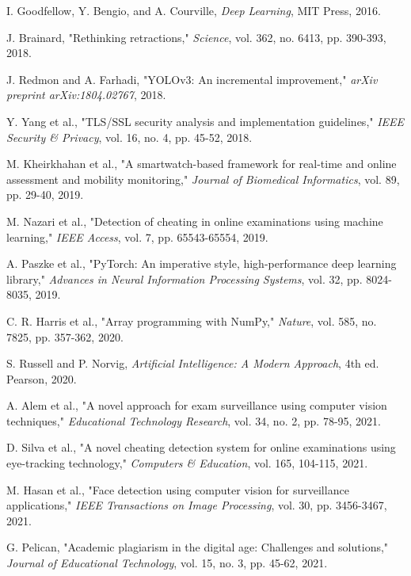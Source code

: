 \documentclass[conference]{IEEEtran}
\begin{document}
\begin{thebibliography}{99}

I. Goodfellow, Y. Bengio, and A. Courville, \textit{Deep Learning}, MIT Press, 2016.

J. Brainard, "Rethinking retractions," \textit{Science}, vol. 362, no. 6413, pp. 390-393, 2018.

J. Redmon and A. Farhadi, "YOLOv3: An incremental improvement," \textit{arXiv preprint arXiv:1804.02767}, 2018.

Y. Yang et al., "TLS/SSL security analysis and implementation guidelines," \textit{IEEE Security \& Privacy}, vol. 16, no. 4, pp. 45-52, 2018.

M. Kheirkhahan et al., "A smartwatch-based framework for real-time and online assessment and mobility monitoring," \textit{Journal of Biomedical Informatics}, vol. 89, pp. 29-40, 2019.

M. Nazari et al., "Detection of cheating in online examinations using machine learning," \textit{IEEE Access}, vol. 7, pp. 65543-65554, 2019.

A. Paszke et al., "PyTorch: An imperative style, high-performance deep learning library," \textit{Advances in Neural Information Processing Systems}, vol. 32, pp. 8024-8035, 2019.

C. R. Harris et al., "Array programming with NumPy," \textit{Nature}, vol. 585, no. 7825, pp. 357-362, 2020.

S. Russell and P. Norvig, \textit{Artificial Intelligence: A Modern Approach}, 4th ed. Pearson, 2020.

A. Alem et al., "A novel approach for exam surveillance using computer vision techniques," \textit{Educational Technology Research}, vol. 34, no. 2, pp. 78-95, 2021.

D. Silva et al., "A novel cheating detection system for online examinations using eye-tracking technology," \textit{Computers \& Education}, vol. 165, 104-115, 2021.

M. Hasan et al., "Face detection using computer vision for surveillance applications," \textit{IEEE Transactions on Image Processing}, vol. 30, pp. 3456-3467, 2021.

G. Pelican, "Academic plagiarism in the digital age: Challenges and solutions," \textit{Journal of Educational Technology}, vol. 15, no. 3, pp. 45-62, 2021.


\end{thebibliography}
\end{document}
